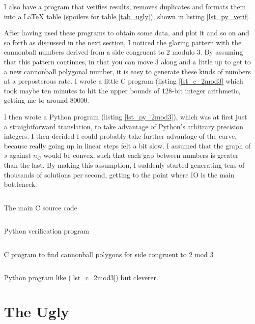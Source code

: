 I also have a program that verifies results, removes duplicates and formats them
into a \LaTeX{} table (spoilers for table \ref{tab_ugly}), shown in listing
\ref{lst_py_verif}.

After having used these programs to obtain some data, and plot it and so on and
so forth as discussed in the next section, I noticed the glaring pattern with
the cannonball numbers derived from a side congruent to 2 modulo 3. By
assuming that this pattern continues, in that you can move 3 along and a little
up to get to a new cannonball polygonal number, it is easy to generate these
kinds of numbers at a preposterous rate. I wrote a little C program (listing
\ref{lst_c_2mod3} which took maybe ten minutes to hit the upper bounds of
128-bit integer arithmetic, getting me to around 80000.

I then wrote a Python program (listing \ref{lst_py_2mod3}), which was at first
just a straightforward translation, to take advantage of Python's arbitrary
precision integers. I then decided I could probably take further advantage of
the curve, because really going up in linear steps felt a bit slow. I assumed
that the graph of \(s\) against \(n_C\) would be convex, such that each gap
between numbers is greater than the last. By making this assumption, I suddenly
started generating tens of thousands of solutions per second, getting to the
point where IO is the main bottleneck.

\begin{longlisting}
\inputminted{c}{../src/c/cannonball.c}
\caption{The main C source code}
\label{lst_c}
\end{longlisting}

\begin{longlisting}
\inputminted{python}{../src/factcheck.py}
\caption{Python verification program}
\label{lst_py_verif}
\end{longlisting}

\begin{longlisting}
\inputminted{c}{../src/c/2mod3/2mod3.c}
\caption{C program to find cannonball polygons for side congruent to 2 mod 3}
\label{lst_c_2mod3}
\end{longlisting}

\begin{longlisting}
\inputminted{python}{../src/c/2mod3/2mod3.py}
\caption{Python program like (\ref{lst_c_2mod3}) but cleverer.}
\label{lst_py_2mod3}
\end{longlisting}

\section{The Ugly}

